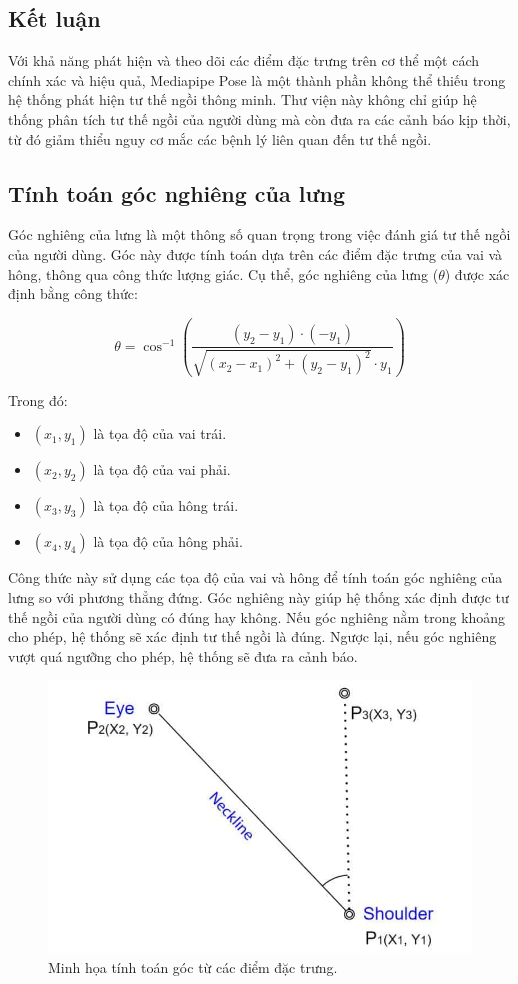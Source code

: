 \documentclass[conference]{IEEEtran}
\begin{document}
\subsection{Kết luận}
Với khả năng phát hiện và theo dõi các điểm đặc trưng trên cơ thể một cách chính xác và hiệu quả, Mediapipe Pose là một thành phần không thể thiếu trong hệ thống phát hiện tư thế ngồi thông minh. Thư viện này không chỉ giúp hệ thống phân tích tư thế ngồi của người dùng mà còn đưa ra các cảnh báo kịp thời, từ đó giảm thiểu nguy cơ mắc các bệnh lý liên quan đến tư thế ngồi.


\subsection{Tính toán góc nghiêng của lưng}
Góc nghiêng của lưng là một thông số quan trọng trong việc đánh giá tư thế ngồi của người dùng. Góc này được tính toán dựa trên các điểm đặc trưng của vai và hông, thông qua công thức lượng giác. Cụ thể, góc nghiêng của lưng (\(\theta\)) được xác định bằng công thức:

\begin{equation}
\theta = \cos^{-1}\left( \frac{(y_2 - y_1) \cdot (-y_1)}{\sqrt{(x_2 - x_1)^2 + (y_2 - y_1)^2} \cdot y_1} \right)
\end{equation}

Trong đó:
\begin{itemize}
    \item \((x_1, y_1)\) là tọa độ của vai trái.
    \item \((x_2, y_2)\) là tọa độ của vai phải.
    \item \((x_3, y_3)\) là tọa độ của hông trái.
    \item \((x_4, y_4)\) là tọa độ của hông phải.
\end{itemize}

Công thức này sử dụng các tọa độ của vai và hông để tính toán góc nghiêng của lưng so với phương thẳng đứng. Góc nghiêng này giúp hệ thống xác định được tư thế ngồi của người dùng có đúng hay không. Nếu góc nghiêng nằm trong khoảng cho phép, hệ thống sẽ xác định tư thế ngồi là đúng. Ngược lại, nếu góc nghiêng vượt quá ngưỡng cho phép, hệ thống sẽ đưa ra cảnh báo.

\begin{figure}[H]
    \centering
    \includegraphics[width=0.9\linewidth]{images/angle_calculation.png}
    \caption{Minh họa tính toán góc từ các điểm đặc trưng.}
    \label{fig:angle_calculation}
\end{figure}
\end{document}
